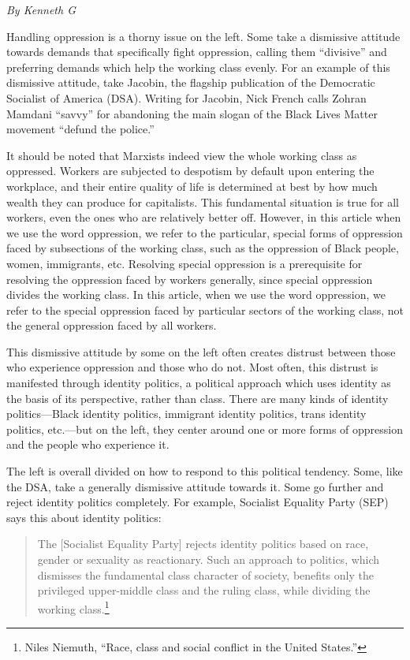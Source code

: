 \emph{By Kenneth G}

Handling oppression is a thorny issue on the left. Some take a dismissive attitude towards demands that specifically fight oppression, calling them ``divisive'' and preferring demands which help the working class evenly. For an example of this dismissive attitude, take Jacobin, the flagship publication of the Democratic Socialist of America (DSA). Writing for Jacobin, Nick French calls Zohran Mamdani ``savvy'' for abandoning the main slogan of the Black Lives Matter movement ``defund the police.''

It should be noted that Marxists indeed view the whole working class as oppressed. Workers are subjected to despotism by default upon entering the workplace, and their entire quality of life is determined at best by how much wealth they can produce for capitalists. This fundamental situation is true for all workers, even the ones who are relatively better off. However, in this article when we use the word oppression, we refer to the particular, special forms of oppression faced by subsections of the working class, such as the oppression of Black people, women, immigrants, etc. Resolving special oppression is a prerequisite for resolving the oppression faced by workers generally, since special oppression divides the working class. In this article, when we use the word oppression, we refer to the special oppression faced by particular sectors of the working class, not the general oppression faced by all workers.

This dismissive attitude by some on the left often creates distrust between those who experience oppression and those who do not. Most often, this distrust is manifested through identity politics, a political approach which uses identity as the basis of its perspective, rather than class. There are many kinds of identity politics---Black identity politics, immigrant identity politics, trans identity politics, etc.---but on the left, they center around one or more forms of oppression and the people who experience it.

The left is overall divided on how to respond to this political tendency. Some, like the DSA, take a generally dismissive attitude towards it. Some go further and reject identity politics completely. For example, Socialist Equality Party (SEP) says this about identity politics:

\blockquote{The [Socialist Equality Party] rejects identity politics based on race, gender or sexuality as reactionary. Such an approach to politics, which dismisses the fundamental class character of society, benefits only the privileged upper-middle class and the ruling class, while dividing the working class.\footnote{Niles Niemuth, ``Race, class and social conflict in the United States.''}}

